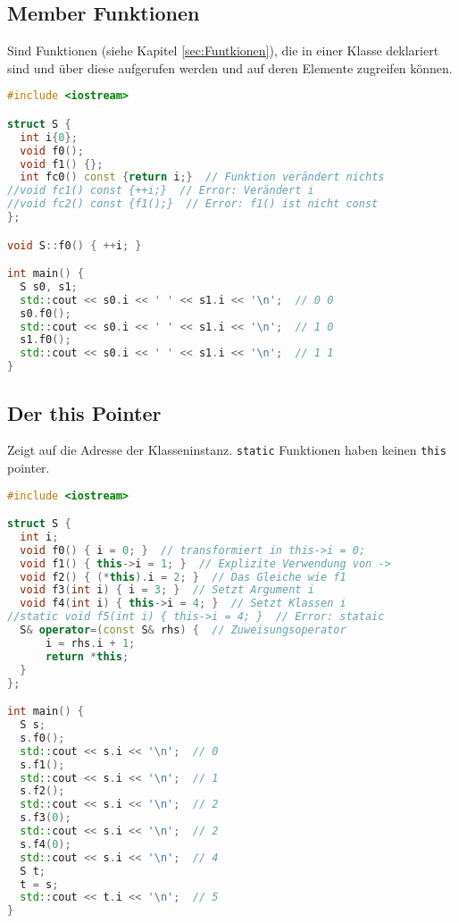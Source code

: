 \subsection{Member Funktionen}

Sind Funktionen (siehe Kapitel \ref{sec:Funtkionen}), die in einer Klasse
deklariert sind und über diese aufgerufen werden und auf deren Elemente
zugreifen können.

\begin{lstlisting}[language=C++]
#include <iostream>

struct S {
  int i{0};
  void f0();
  void f1() {};
  int fc0() const {return i;}  // Funktion verändert nichts
//void fc1() const {++i;}  // Error: Verändert i
//void fc2() const {f1();}  // Error: f1() ist nicht const
};

void S::f0() { ++i; }

int main() {
  S s0, s1;
  std::cout << s0.i << ' ' << s1.i << '\n';  // 0 0
  s0.f0();
  std::cout << s0.i << ' ' << s1.i << '\n';  // 1 0
  s1.f0();
  std::cout << s0.i << ' ' << s1.i << '\n';  // 1 1
}
\end{lstlisting}

\subsection{Der this Pointer}

Zeigt auf die Adresse der Klasseninstanz. \lstinline|static| Funktionen haben keinen \lstinline|this| pointer.

\begin{lstlisting}[language=C++]
#include <iostream>

struct S {
  int i;
  void f0() { i = 0; }  // transformiert in this->i = 0;
  void f1() { this->i = 1; }  // Explizite Verwendung von ->
  void f2() { (*this).i = 2; }  // Das Gleiche wie f1
  void f3(int i) { i = 3; }  // Setzt Argument i
  void f4(int i) { this->i = 4; }  // Setzt Klassen i
//static void f5(int i) { this->i = 4; }  // Error: stataic
  S& operator=(const S& rhs) {  // Zuweisungsoperator
      i = rhs.i + 1;
      return *this;
  }
};

int main() {
  S s;
  s.f0();
  std::cout << s.i << '\n';  // 0
  s.f1();
  std::cout << s.i << '\n';  // 1
  s.f2();
  std::cout << s.i << '\n';  // 2
  s.f3(0);
  std::cout << s.i << '\n';  // 2
  s.f4(0);
  std::cout << s.i << '\n';  // 4
  S t;
  t = s;
  std::cout << t.i << '\n';  // 5
}
\end{lstlisting}

